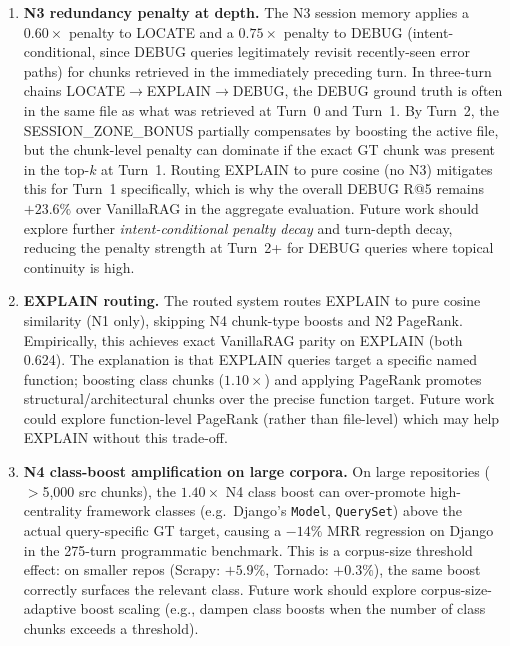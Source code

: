 \documentclass[runningheads]{llncs}
\begin{document}
\begin{enumerate}[leftmargin=*,label=(\arabic*)]
  \item \textbf{N3 redundancy penalty at depth.} The N3 session
        memory applies a $0.60\times$ penalty to LOCATE and a
        $0.75\times$ penalty to DEBUG (intent-conditional, since
        DEBUG queries legitimately revisit recently-seen error paths)
        for chunks retrieved in the immediately preceding turn.
        In three-turn chains LOCATE$\to$EXPLAIN$\to$DEBUG, the
        DEBUG ground truth is often in the same file as what was
        retrieved at Turn~0 and Turn~1. By Turn~2, the SESSION\_ZONE\_BONUS
        partially compensates by boosting the active file, but the
        chunk-level penalty can dominate if the exact GT chunk was
        present in the top-$k$ at Turn~1. Routing EXPLAIN to pure
        cosine (no N3) mitigates this for Turn~1 specifically,
        which is why the overall DEBUG R@5 remains $+23.6\%$ over
        VanillaRAG in the aggregate evaluation. Future work should
        explore further \emph{intent-conditional penalty decay} and
        turn-depth decay, reducing the penalty strength at Turn~2+
        for DEBUG queries where topical continuity is high.

  \item \textbf{EXPLAIN routing.} The routed system routes EXPLAIN
        to pure cosine similarity (N1 only), skipping N4 chunk-type
        boosts and N2 PageRank. Empirically, this achieves exact
        VanillaRAG parity on EXPLAIN (both 0.624). The explanation
        is that EXPLAIN queries target a specific named function;
        boosting class chunks ($1.10\times$) and applying PageRank
        promotes structural/architectural chunks over the precise
        function target. Future work could explore function-level
        PageRank (rather than file-level) which may help EXPLAIN
        without this trade-off.

  \item \textbf{N4 class-boost amplification on large corpora.}
        On large repositories ($>$5,000 src chunks), the $1.40\times$
        N4 class boost can over-promote high-centrality framework
        classes (e.g.\ Django's \texttt{Model}, \texttt{QuerySet})
        above the actual query-specific GT target, causing a $-14\%$
        MRR regression on Django in the 275-turn programmatic benchmark.
        This is a corpus-size threshold effect: on smaller repos
        (Scrapy: $+5.9\%$, Tornado: $+0.3\%$), the same boost
        correctly surfaces the relevant class. Future work should
        explore corpus-size-adaptive boost scaling (e.g., dampen class
        boosts when the number of class chunks exceeds a threshold).


\end{enumerate}
\end{document}
